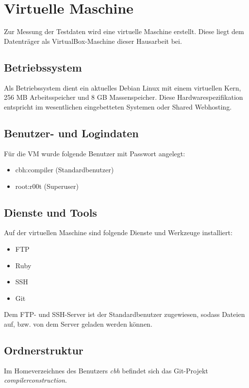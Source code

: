 
\section{Virtuelle Maschine}
Zur Messung der Testdaten wird eine virtuelle Maschine erstellt. Diese liegt dem Datenträger als VirtualBox-Maschine dieser Hausarbeit bei. 

\subsection{Betriebssystem}
Als Betriebssystem dient ein aktuelles Debian Linux mit einem virtuellen Kern, 256 MB Arbeitsspeicher und 8 GB Massenspeicher. Diese Hardwarespezifikation entspricht im wesentlichen eingebetteten Systemen oder Shared Webhosting. 

\subsection{Benutzer- und Logindaten}

Für die VM wurde folgende Benutzer mit Passwort angelegt:
\begin{itemize}
    \item{cbh:compiler (Standardbenutzer)}
    \item{root:r00t (Superuser)}
\end{itemize}

\subsection{Dienste und Tools}

Auf der virtuellen Maschine sind folgende Dienste und Werkzeuge installiert: 

\begin{itemize}
    \item{FTP}
    \item{Ruby}
    \item{SSH}
    \item{Git}
\end{itemize}

Dem FTP- und SSH-Server ist der Standardbenutzer zugewiesen, sodass Dateien auf, bzw. von dem Server geladen werden können.

\subsection{Ordnerstruktur}
Im Homeverzeichnes des Benutzers \textit{cbh} befindet sich das Git-Projekt \textit{compilerconstruction}.
